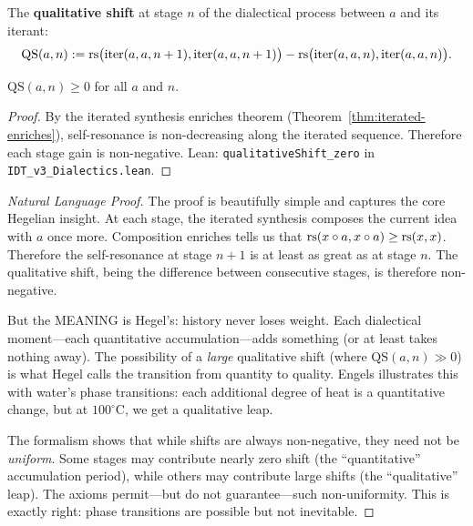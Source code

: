 \begin{definition}
\label{def:qualitative-shift}
The \textbf{qualitative shift} at stage $n$ of the dialectical process between
$a$ and its iterant:
\[
\mathrm{QS}(a, n) := \mathrm{rs}\bigl(\mathrm{iter}(a, a, n+1), \mathrm{iter}(a, a, n+1)\bigr) -
\mathrm{rs}\bigl(\mathrm{iter}(a, a, n), \mathrm{iter}(a, a, n)\bigr).
\]
\end{definition}

\begin{theorem}
\label{thm:qualitative-nonneg}
$\mathrm{QS}(a, n) \geq 0$ for all $a$ and $n$.
\end{theorem}

\begin{proof}
By the iterated synthesis enriches theorem (Theorem~\ref{thm:iterated-enriches}),
self-resonance is non-decreasing along the iterated sequence. Therefore each
stage gain is non-negative. Lean: \texttt{qualitativeShift\_zero} in
\texttt{IDT\_v3\_Dialectics.lean}.
\end{proof}

\begin{proof}[Natural Language Proof]
The proof is beautifully simple and captures the core Hegelian insight.
At each stage, the iterated synthesis composes the current idea with $a$
once more. Composition enriches tells us that $\mathrm{rs}(x \circ a, x \circ a)
\geq \mathrm{rs}(x, x)$. Therefore the self-resonance at stage $n+1$ is at least
as great as at stage $n$. The qualitative shift, being the difference
between consecutive stages, is therefore non-negative.

But the MEANING is Hegel's: history never loses weight. Each dialectical
moment---each quantitative accumulation---adds something (or at least takes
nothing away). The possibility of a \emph{large} qualitative shift
(where $\mathrm{QS}(a, n) \gg 0$) is what Hegel calls the transition from
quantity to quality. Engels illustrates this with water's phase transitions:
each additional degree of heat is a quantitative change, but at $100^{\circ}$C,
we get a qualitative leap.

The formalism shows that while shifts are always non-negative, they need not
be \emph{uniform}. Some stages may contribute nearly zero shift (the
``quantitative'' accumulation period), while others may contribute large
shifts (the ``qualitative'' leap). The axioms permit---but do not
guarantee---such non-uniformity. This is exactly right: phase transitions
are possible but not inevitable.
\end{proof}

